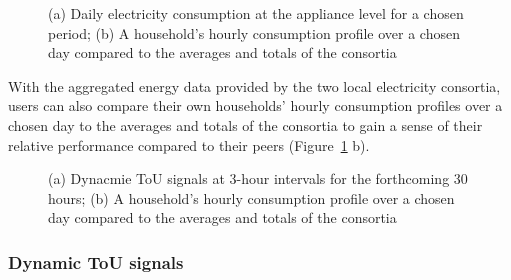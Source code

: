 \begin{figure}
      \begin{center}
        \begin{minipage}[htb]{0.48\linewidth}    
        \end{minipage}
	\hfill 
        \begin{minipage}[htb]{0.45\linewidth}    
        \end{minipage}
      \end{center}
      \caption{(a) Daily electricity consumption at the appliance level for a chosen period;  (b) 
      A household's hourly consumption profile over a chosen day compared to the averages and totals of the consortia
}
\label{fig:viz_hist}
\end{figure}
With the aggregated energy data provided by the two local electricity consortia, users can also  compare their own households' hourly consumption profiles over a chosen day to the averages and totals of the consortia to gain a sense of their relative performance compared to their peers (Figure~\ref{fig:viz_hist} b). 

\begin{figure}
      \begin{center}
        \begin{minipage}[htb]{0.49\linewidth}    
        \end{minipage}
	\hfill 
        \begin{minipage}[htb]{0.49\linewidth}    
        \end{minipage}
      \end{center}
      \caption{(a) Dynacmie ToU signals at 3-hour intervals for the forthcoming 30 hours;  (b) 
      A household's hourly consumption profile over a chosen day compared to the averages and totals of the consortia
}
\label{fig:tou}
\end{figure}

\subsubsection{Dynamic ToU signals} 

